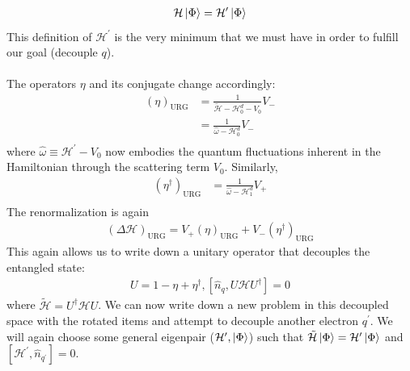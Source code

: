 \documentclass[twoside,11pt]{report}
\numberwithin{equation}{section}
\begin{document}
\begin{equation}\begin{aligned}
\mathcal{H}\ket{\Phi} = \mathcal{H}^\prime \ket{\Phi}
\end{aligned}\end{equation}
This definition of \(\mathcal{H}^\prime\) is the very minimum that we must have in order to fulfill our goal (decouple \(q\)). 
\\\\The operators \(\eta\) and its conjugate change accordingly:
\begin{equation}\begin{aligned}
	\left(\eta\right)_\text{URG} &= \frac{1}{\tilde{\mathcal{H}} - \mathcal{H}^d_0 - V_0}V_-\\
     &= \frac{1}{\hat \omega - \mathcal{H}^d_0}V_-\\
\end{aligned}\end{equation}
where \(\hat \omega \equiv \mathcal{H}^\prime - V_0\) now embodies the quantum fluctuations inherent in the Hamiltonian through the scattering term \(V_0\). Similarly,
\begin{equation}\begin{aligned}
	\left(\eta^\dagger\right)_\text{URG} &= \frac{1}{\hat \omega - \mathcal{H}^d_1}V_+\\
\end{aligned}\end{equation}
The renormalization is again
\begin{equation}\begin{aligned}
	\left(\Delta \mathcal{H}\right)_\text{URG} = V_+\left(\eta\right)_\text{URG} + V_-\left(\eta^\dagger\right)_\text{URG}
\end{aligned}\end{equation}
This again allows us to write down a unitary operator that decouples the entangled state:
\begin{equation}\begin{aligned}
	U =  1 - \eta + \eta^\dagger, \left[\hat n_q, U \mathcal{H} U^\dagger\right] = 0
\end{aligned}\end{equation}
where \(\tilde{\mathcal{H}} = U^\dagger \mathcal{H} U\). We can now write down a new problem in this decoupled space with the rotated items and attempt to decouple another electron \(q^\prime\). We will again choose some general eigenpair (\(\mathcal{H}^\prime,\ket{\Phi}\)) such that \(\tilde{\mathcal{H}}\ket{\Phi} = \mathcal{H}^{\prime}\ket{\Phi}\) and \(\left[\mathcal{H}^{\prime},\hat n_{q^\prime}\right]=0\).
\end{document}
